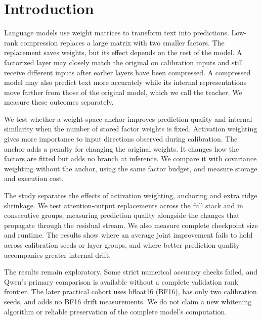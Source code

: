 \documentclass[conference]{IEEEtran}
\begin{document}
\section{Introduction}
Language models use weight matrices to transform text into predictions. Low-rank compression replaces a large matrix with two smaller factors. The replacement saves weights, but its effect depends on the rest of the model. A factorized layer may closely match the original on calibration inputs and still receive different inputs after earlier layers have been compressed. A compressed model may also predict text more accurately while its internal representations move farther from those of the original model, which we call the teacher. We measure these outcomes separately.\par\smallskip
We test whether a weight-space anchor improves prediction quality and internal similarity when the number of stored factor weights is fixed. Activation weighting gives more importance to input directions observed during calibration. The anchor adds a penalty for changing the original weights. It changes how the factors are fitted but adds no branch at inference. We compare it with covariance weighting without the anchor, using the same factor budget, and measure storage and execution cost.\par\smallskip
The study separates the effects of activation weighting, anchoring and extra ridge shrinkage. We test attention-output replacements across the full stack and in consecutive groups, measuring prediction quality alongside the changes that propagate through the residual stream. We also measure complete checkpoint size and runtime. The results show where an average joint improvement fails to hold across calibration seeds or layer groups, and where better prediction quality accompanies greater internal drift.\par\smallskip
The results remain exploratory. Some strict numerical accuracy checks failed, and Qwen's primary comparison is available without a complete validation rank frontier. The later practical cohort uses bfloat16 (BF16), has only two calibration seeds, and adds no BF16 drift measurements. We do not claim a new whitening algorithm or reliable preservation of the complete model's computation.\par\smallskip
\end{document}
